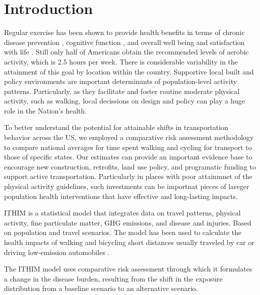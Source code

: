 \documentclass{bioinfo}
\begin{document}
\section{Introduction}

Regular exercise has been shown to provide health benefits in terms of
chronic disease prevention \cite{warburton2006}, cognitive function
\cite{hillman2008}, and overall well being and satisfaction with life
\cite{maher2013}. Still only half of Americans obtain the recommended
levels of aerobic activity, which is 2.5 hours per week. There is
considerable variability in the attainment of this goal by location
within the country. Supportive local built and policy environments are
important determinants of population-level activity
patterns. Particularly, as they facilitate and foster routine moderate
physical activity, such as walking, local decissions on design and
policy can play a huge role in the Nation's health.

To better understand the potential for attainable shifts in
transportation behavior across the US, we employed a comparative risk
assessment methodology to compare national averages for time spent
walking and cycling for transport to those of specific states. Our
estimates can provide an important evidence base to encourage new
construction, retrofits, land use policy, and programatic funding to
support active transportation. Particularly in places with poor
attainmnet of the physical activity guidelines, such investments can
be importnat pieces of lareger population health interventions that
have effective and long-lasting impacts.

ITHIM is a statistical model that integrates data on travel patterns,
physical activity, fine particulate matter, GHG emissions, and disease
and injuries. Based on population and travel scenarios. The model has
been used to calculate the health impacts of walking and bicycling
short distances usually traveled by car or driving low-emission
automobiles \cite{woodcock2013,maizlish2013}.

The ITHIM model uses comparative risk assessment through which it
formulates a change in the disease burden, resulting from the shift in
the exposure distribution from a baseline scenario to an alternative
scenario.
\end{document}
